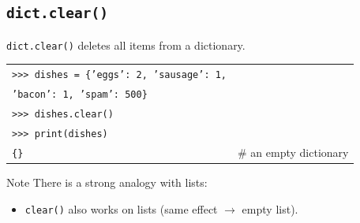 \documentclass[t,handout,9pt]{beamer}
\begin{document}
\subsection{\texttt{dict.clear()}}
\begin{frame}
\vfill
\texttt{dict.clear()} deletes all items from a dictionary.\\
\begin{table}[]
\begin{flushleft}
\begin{tabular}{ll}
\texttt{>{}>{}> dishes = \{'eggs': 2, 'sausage': 1,} &   \\
\texttt{\qquad 'bacon': 1, 'spam': 500\}} &   \\
\texttt{>{}>{}> dishes.clear()} &   \\
\texttt{>{}>{}> print(dishes)} &   \\
\texttt{\{\}} & \# an empty dictionary  \\
\end{tabular}
\end{flushleft}
\end{table}
\begin{block}{Note}
There is a strong analogy with lists:
\begin{itemize}
	\item \texttt{clear()} also works on lists (same effect $\rightarrow$ empty list).
\end{itemize}
\end{block}
\vfill
\end{frame}
%
\end{document}
